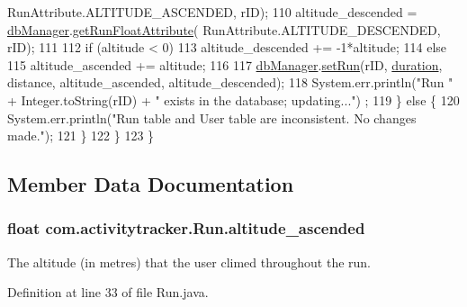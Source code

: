 \begin{DoxyCode}
      RunAttribute.ALTITUDE\_ASCENDED, rID);
110                 altitude\_descended = \hyperlink{classcom_1_1activitytracker_1_1_run_ab90e32eda9f4c671ae3575f971edca6b}{dbManager}.\hyperlink{classcom_1_1activitytracker_1_1_d_b_manager_a666452f1e5862f90c06b0beb9a9fcfdd}{getRunFloatAttribute}(
      RunAttribute.ALTITUDE\_DESCENDED, rID);
111 
112                 \textcolor{keywordflow}{if} (altitude < 0)
113                     altitude\_descended += -1*altitude;
114                 \textcolor{keywordflow}{else}
115                     altitude\_ascended += altitude;
116 
117                 \hyperlink{classcom_1_1activitytracker_1_1_run_ab90e32eda9f4c671ae3575f971edca6b}{dbManager}.\hyperlink{classcom_1_1activitytracker_1_1_d_b_manager_a72282377a552ce4ce371abff02e312f2}{setRun}(rID, \hyperlink{classcom_1_1activitytracker_1_1_run_a5e38d293d29d4b65c9290ff4bee82e03}{duration}, distance, altitude\_ascended, 
      altitude\_descended);
118                 System.err.println(\textcolor{stringliteral}{"Run "} + Integer.toString(rID) + \textcolor{stringliteral}{" exists in the database; updating..."})
      ;
119             \} \textcolor{keywordflow}{else} \{
120                 System.err.println(\textcolor{stringliteral}{"Run table and User table are inconsistent. No changes made."});
121             \}
122         \}
123     \}
\end{DoxyCode}


\subsection{Member Data Documentation}
\subsubsection[{\texorpdfstring{altitude\+\_\+ascended}{altitude_ascended}}]{\setlength{\rightskip}{0pt plus 5cm}float com.\+activitytracker.\+Run.\+altitude\+\_\+ascended\hspace{0.3cm}{\ttfamily [package]}}\hypertarget{classcom_1_1activitytracker_1_1_run_a247fe29ef5dceeb25750fc7c2701f5c8}{}\label{classcom_1_1activitytracker_1_1_run_a247fe29ef5dceeb25750fc7c2701f5c8}
The altitude (in metres) that the user climed throughout the run. 

Definition at line 33 of file Run.\+java.

